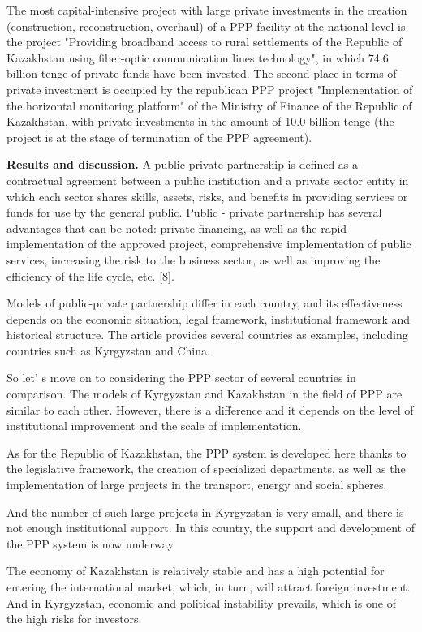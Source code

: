 The most capital-intensive project with large private investments in the
creation (construction, reconstruction, overhaul) of a PPP facility at
the national level is the project "Providing broadband access to rural
settlements of the Republic of Kazakhstan using fiber-optic
communication lines technology", in which 74.6 billion tenge of private
funds have been invested. The second place in terms of private
investment is occupied by the republican PPP project "Implementation of
the horizontal monitoring platform" of the Ministry of Finance of the
Republic of Kazakhstan, with private investments in the amount of 10.0
billion tenge (the project is at the stage of termination of the PPP
agreement).

{\bfseries Results and discussion.} A public-private partnership is defined
as a contractual agreement between a public institution and a private
sector entity in which each sector shares skills, assets, risks, and
benefits in providing services or funds for use by the general public.
Public - private partnership has several advantages that can be noted:
private financing, as well as the rapid implementation of the approved
project, comprehensive implementation of public services, increasing the
risk to the business sector, as well as improving the efficiency of the
life cycle, etc. {[}8{]}.

Models of public-private partnership differ in each country, and its
effectiveness depends on the economic situation, legal framework,
institutional framework and historical structure. The article provides
several countries as examples, including countries such as Kyrgyzstan
and China.

So let' s move on to considering the PPP sector of
several countries in comparison. The models of Kyrgyzstan and Kazakhstan
in the field of PPP are similar to each other. However, there is a
difference and it depends on the level of institutional improvement and
the scale of implementation.

As for the Republic of Kazakhstan, the PPP system is developed here
thanks to the legislative framework, the creation of specialized
departments, as well as the implementation of large projects in the
transport, energy and social spheres.

And the number of such large projects in Kyrgyzstan is very small, and
there is not enough institutional support. In this country, the support
and development of the PPP system is now underway.

The economy of Kazakhstan is relatively stable and has a high potential
for entering the international market, which, in turn, will attract
foreign investment. And in Kyrgyzstan, economic and political
instability prevails, which is one of the high risks for investors.

